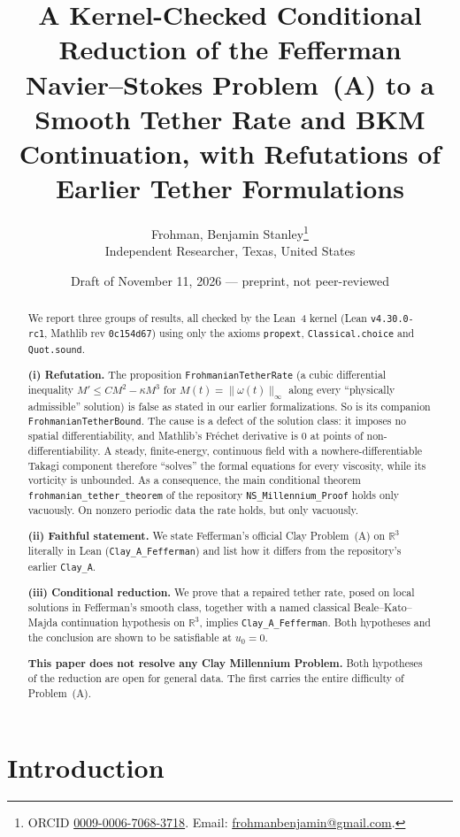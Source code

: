 \documentclass[11pt,a4paper]{article}
\title{A Kernel-Checked Conditional Reduction of the Fefferman Navier--Stokes Problem~(A) to a Smooth Tether Rate and BKM Continuation, with Refutations of Earlier Tether Formulations}
\author{Frohman, Benjamin Stanley\thanks{ORCID \href{https://orcid.org/0009-0006-7068-3718}{0009-0006-7068-3718}. Email: \href{mailto:frohmanbenjamin@gmail.com}{frohmanbenjamin@gmail.com}.}\\[2pt]
\small Independent Researcher, Texas, United States}
\date{Draft of November 11, 2026 --- preprint, not peer-reviewed}
\theoremstyle{definition}
\theoremstyle{remark}
\newcommand{\R}{\mathbb{R}}
\newcommand{\lean}[1]{\texttt{#1}}
\begin{document}
\maketitle

\begin{abstract}
We report three groups of results, all checked by the Lean~4 kernel (Lean \lean{v4.30.0-rc1}, Mathlib rev \lean{0c154d67}) using only the axioms \lean{propext}, \lean{Classical.choice} and \lean{Quot.sound}.

\textbf{(i) Refutation.} The proposition \lean{FrohmanianTetherRate} (a cubic differential inequality $M'\le CM^2-\kappa M^3$ for $M(t)=\|\omega(t)\|_\infty$ along every ``physically admissible'' solution) is false as stated in our earlier formalizations. So is its companion \lean{FrohmanianTetherBound}. The cause is a defect of the solution class: it imposes no spatial differentiability, and Mathlib's Fréchet derivative is $0$ at points of non-differentiability. A steady, finite-energy, continuous field with a nowhere-differentiable Takagi component therefore ``solves'' the formal equations for every viscosity, while its vorticity is unbounded. As a consequence, the main conditional theorem \lean{frohmanian\_tether\_theorem} of the repository \lean{NS\_Millennium\_Proof} holds only vacuously. On nonzero periodic data the rate holds, but only vacuously.

\textbf{(ii) Faithful statement.} We state Fefferman's official Clay Problem~(A) on $\R^3$ literally in Lean (\lean{Clay\_A\_Fefferman}) and list how it differs from the repository's earlier \lean{Clay\_A}.

\textbf{(iii) Conditional reduction.} We prove that a repaired tether rate, posed on local solutions in Fefferman's smooth class, together with a named classical Beale--Kato--Majda continuation hypothesis on $\R^3$, implies \lean{Clay\_A\_Fefferman}. Both hypotheses and the conclusion are shown to be satisfiable at $u_0=0$.

\textbf{This paper does not resolve any Clay Millennium Problem.} Both hypotheses of the reduction are open for general data. The first carries the entire difficulty of Problem~(A).
\end{abstract}

\tableofcontents

\section{Introduction}
\end{document}
